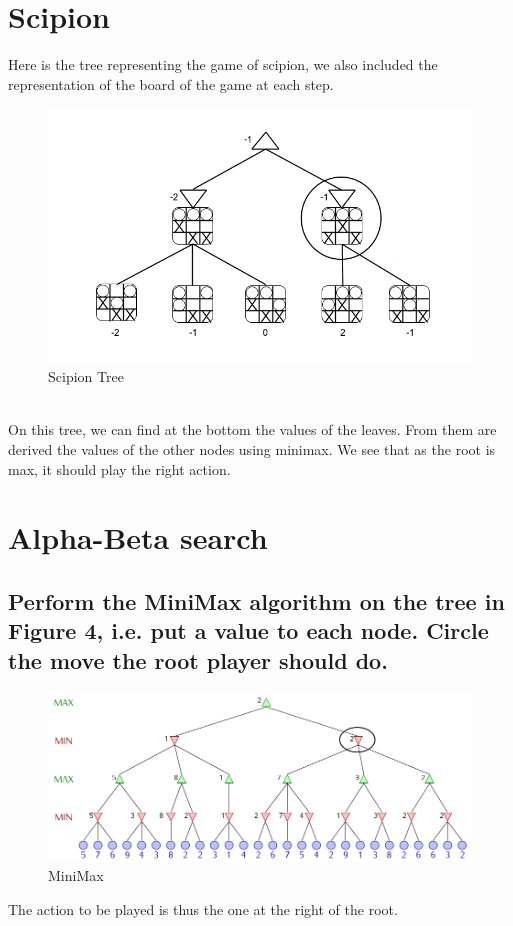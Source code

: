 \documentclass[a4paper,10pt]{article}
\begin{document}
	\newpage
	

	\section{Scipion}
		Here is the tree representing the game of scipion, we also included the representation of the board of the game at each step.
		\begin{figure}[h!]
			\centering
				\includegraphics[scale=0.5]{minmax_tree_scipion_specs.png}
			\caption{Scipion Tree}
		\end{figure}\\
		On this tree, we can find at the bottom the values of the leaves. From them are derived the values of the other nodes using minimax. We see that as the root is max, it should play the right action.
	\section{Alpha-Beta search}	
		\subsection{Perform the MiniMax algorithm on the tree in Figure 4, i.e. put a value to each node. Circle the move the root player should do.}
		\begin{figure}[h!]
			\centering
				\includegraphics[scale=0.4]{arbre_minimax.png}
			\caption{MiniMax}
		\end{figure}
		The action to be played is thus the one at the right of the root.
\end{document}
